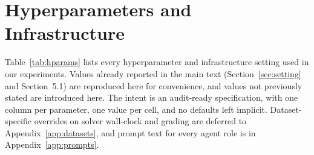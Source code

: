 \section{Hyperparameters and Infrastructure}\label{app:hyperparameters}

Table~\ref{tab:hparams} lists every hyperparameter and infrastructure setting used in our experiments.
Values already reported in the main text (Section~\ref{sec:setting} and Section~5.1) are reproduced here for convenience, and values not previously stated are introduced here.
The intent is an audit-ready specification, with one column per parameter, one value per cell, and no defaults left implicit.
Dataset-specific overrides on solver wall-clock and grading are deferred to Appendix~\ref{app:datasets}, and prompt text for every agent role is in Appendix~\ref{app:prompts}.

